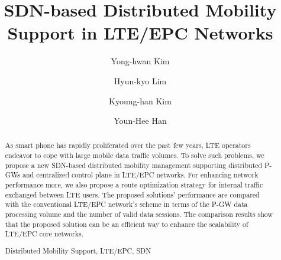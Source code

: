 \documentclass[runningheads,a4paper]{llncs}
\newcommand{\keywords}[1]{\par\addvspace\baselineskip
\noindent\keywordname\enspace\ignorespaces#1}
\begin{document}
\mainmatter  %

\title{SDN-based Distributed Mobility Support in LTE/EPC Networks}


%
%

\author{Yong-hwan Kim\inst{}
\and Hyun-kyo Lim\inst{}
\and Kyoung-han Kim\inst{}
\and Youn-Hee Han\inst{}}
%


%
%

\maketitle


\begin{abstract}
As smart phone has rapidly proliferated over the past few years, LTE operators endeavor to cope with large mobile data traffic volumes.  To solve such problems, we propose a new SDN-based distributed mobility management supporting distributed P-GWs and centralized control plane in LTE/EPC networks. For enhancing network performance more, we also propose a route optimization strategy for internal traffic exchanged between LTE users. The proposed solutions' performance are compared with the conventional LTE/EPC network's scheme in terms of the P-GW data processing volume and the number of valid data sessions. The comparison results show that the proposed solution can be an efficient way to enhance the scalability of LTE/EPC core networks.

\keywords{Distributed Mobility Support, LTE/EPC, SDN}
\end{abstract}
\end{document}
